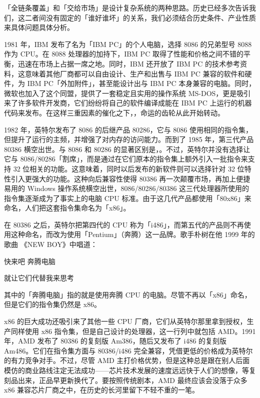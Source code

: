 \begin{note}
  「全链条覆盖」和「交给市场」是设计复杂系统的两种思路。历史已经多次告诉我们，这二者间没有固定的「谁好谁坏」的关系，我们必须结合历史条件、产业性质来具体问题具体分析。
\end{note}

1981 年，IBM 发布了名为「IBM PC」的个人电脑，选择 8086 的兄弟型号 8088 作为 CPU。在 8088 处理器的加持下，IBM PC 取得了性能和价格之间不错的平衡，迅速在市场上占据一席之地。同时，IBM 还开放了 IBM PC 的技术参考资料，这意味着其他厂商都可以自由设计、生产和出售与 IBM PC 兼容的软件和硬件，为 IBM PC「外加附件」，甚至能设计出与 IBM PC 本身兼容的电脑。同时，微软也加入了这个同盟，提供了一套稳定且实用的操作系统 MS-DOS，更是吸引来了许多软件开发商，它们纷纷将自己的软件编译成能在 IBM PC 上运行的机器代码来发布。在这样三重因素的催化之下，，命运的齿轮从此开始转动。

1982 年，英特尔发布了 8086 的后继产品 80286，它与 8086 使用相同的指令集，但提升了运行的主频，并增强了对内存的访问能力。而到了 1985 年，第三代产品 80386 横空出世。与 8086 和 80286 的显著区别是，。不过，英特尔并没有选择让它与 8086/80286「割席」，而是通过在它们原本的指令集上额外引入一批指令来支持 32 位相关的功能。这意味着，同时以后发布的新软件则可以选择针对 32 位特性引入更强大的功能。这种向后兼容性使得 80386 再一次颠覆市场，再加上便捷易用的 Windows 操作系统横空出世，8086/80286/80386 这三代处理器所使用的指令集逐渐成为了事实上的电脑 CPU 标准。由于这几代产品都使用「80x86」来命名，人们把这套指令集命名为「x86」。

\begin{note}
  在 80386 之后，英特尔把第四代的 CPU 称为「i486」，而第五代的产品则不再使用这种命名，而改为使用「Pentium」（奔腾）这一品牌。歌手朴树在他 1999 年的歌曲 《NEW BOY》中唱道：
  \begin{quoting}
    \centering
    快来吧 奔腾电脑\par
    就让它们代替我来思考
  \end{quoting}

  其中的「奔腾电脑」指的就是使用奔腾 CPU 的电脑。尽管不再以「x86」命名，但是它们的指令集仍然是 x86。
\end{note}

x86 的巨大成功还吸引来了其他一些 CPU 厂商，它们从英特尔那里拿到授权，生产同样使用 x86 指令集，但是自己设计的处理器，这一行列中就包括 AMD。1991 年，AMD 发布了 80386 的复刻版 Am386，随后又发布了 i486 的复刻版 Am486。它们在指令集方面与 80386/i486 完全兼容，凭借更低的价格成为英特尔的有力竞争对手。不过，尽管 AMD 主打价格优势，但是这种总是跟在别人后面模仿的商业路线注定无法成功——芯片技术发展的速度远远快于人们的想像，等复刻品出来，正品早更新换代了。要按照传统剧本，AMD 最终应该会没落于众多 x86 兼容芯片厂商之中，在历史的长河里留下不轻不重的一笔。

